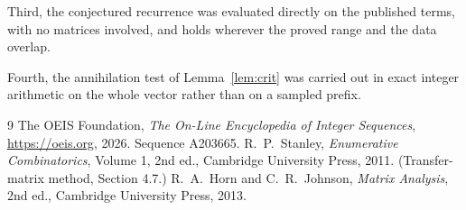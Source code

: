\documentclass[11pt,a4paper]{article}
\theoremstyle{plain}
\theoremstyle{definition}
\begin{document}
Third, the conjectured recurrence was evaluated directly on the published terms, with no
matrices involved, and holds wherever the proved range and the data overlap.

Fourth, the annihilation test of Lemma~\ref{lem:crit} was carried out in exact integer
arithmetic on the whole vector rather than on a sampled prefix.

\begin{thebibliography}{9}
 The OEIS Foundation, \emph{The On-Line Encyclopedia of Integer
Sequences}, \url{https://oeis.org}, 2026. Sequence A203665.
 R.~P.~Stanley, \emph{Enumerative Combinatorics}, Volume 1, 2nd ed.,
Cambridge University Press, 2011. (Transfer-matrix method, Section 4.7.)
 R.~A.~Horn and C.~R.~Johnson, \emph{Matrix Analysis}, 2nd ed., Cambridge
University Press, 2013.
\end{thebibliography}
\end{document}
